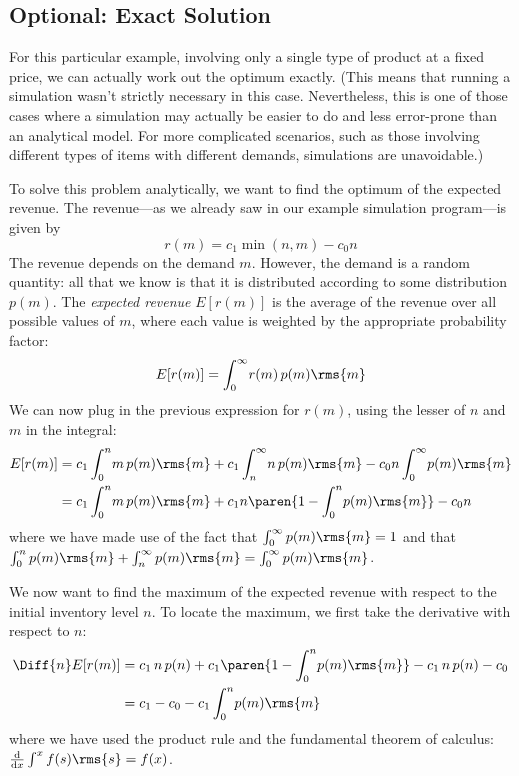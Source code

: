 \subsection{Optional: Exact Solution}

For this particular example, involving only a single type of product
at a fixed price, we can actually work out the optimum exactly. (This
means that running a simulation wasn't strictly necessary in this
case. Nevertheless, this is one of those cases where a simulation may
actually be easier to do and less error-prone than an analytical
model. For more complicated scenarios, such as those involving
different types of items with different demands, simulations are
unavoidable.)

To solve this problem analytically, we want to find the optimum of the
expected revenue. The revenue---as we already saw in our example
simulation program---is given by
%
\[
r(m) = c_1 \min( n, m ) - c_0 n
\]
%
The revenue depends on the demand $m$. However, the demand is a random
quantity: all that we know is that it is distributed according to some
distribution $p(m)$. The \emph{expected revenue} $E[r(m)]$ is the
average of the revenue over all possible values of $m$, where each
value is weighted by the appropriate probability factor:
%
\[
E[ r(m) ] = \int_0^\infty \! r(m) \, p(m) \rms{m}
\]
%
We can now plug in the previous expression for $r(m)$, using the
lesser of $n$ and $m$ in the integral:
%
\begin{align*}
E[ r(m) ] & = c_1 \int_0^n \! m \, p(m) \rms{m}
            + c_1 \int_n^\infty \! n \, p(m) \rms{m} 
            - c_0 n \int_0^\infty \! p(m) \rms{m} \\
          & = c_1 \int_0^n \! m \, p(m) \rms{m}
            + c_1 n \paren{ 1 - \int_0^n \! p(m) \rms{m} }
            - c_0 n
\end{align*}
%
where we have made use of the fact that $\int_0^\infty p(m) \rms{m} =
1$ and that $\int_0^n p(m) \rms{m} + \int_n^\infty p(m) \rms{m} =
\int_0^\infty p(m) \rms{m}$.

We now want to find the maximum of the expected revenue with respect
to the initial inventory level $n$. To locate the maximum, we first
take the derivative with respect to $n$:
%
\begin{align*}
\Diff{n} E[ r(m) ] & = c_1 \, n \, p(n)
                     + c_1 \paren{ 1 - \int_0^n \! p(m) \rms{m} }
                     - c_1 \, n \, p(n)
                     - c_0 \\
                   & = c_1 - c_0 - c_1 \int_0^n \! p(m) \rms{m}
\end{align*}
%
where we have used the product rule and the fundamental theorem
of calculus: $\frac{\rm d}{{\rm d}x}\int^x f(s) \rms{s} = f(x)$.

